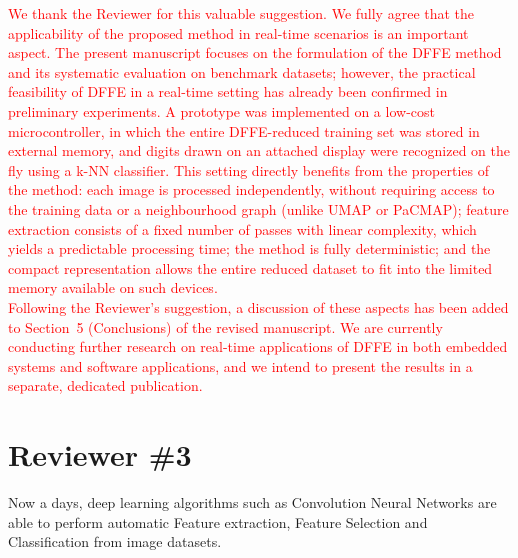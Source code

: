 \documentclass{ar2rc}
\begin{document}
\AR
\textcolor{red}{We thank the Reviewer for this valuable suggestion. We fully agree that the applicability of the proposed method in real-time scenarios is an important aspect. The present manuscript focuses on the formulation of the DFFE method and its systematic evaluation on benchmark datasets; however, the practical feasibility of DFFE in a real-time setting has already been confirmed in preliminary experiments. A prototype was implemented on a low-cost microcontroller, in which the entire DFFE-reduced training set was stored in external memory, and digits drawn on an attached display were recognized on the fly using a k-NN classifier. This setting directly benefits from the properties of the method: each image is processed independently, without requiring access to the training data or a neighbourhood graph (unlike UMAP or PaCMAP); feature extraction consists of a fixed number of passes with linear complexity, which yields a predictable processing time; the method is fully deterministic; and the compact representation allows the entire reduced dataset to fit into the limited memory available on such devices. \\
Following the Reviewer's suggestion, a discussion of these aspects has been added to Section~5 (Conclusions) of the revised manuscript. We are currently conducting further research on real-time applications of DFFE in both embedded systems and software applications, and we intend to present the results in a separate, dedicated publication.}



\section*{Reviewer \#3}

\RC %
Now a days, deep learning algorithms such as Convolution Neural Networks are able to perform automatic Feature extraction, Feature Selection and Classification from image datasets.
\end{document}
